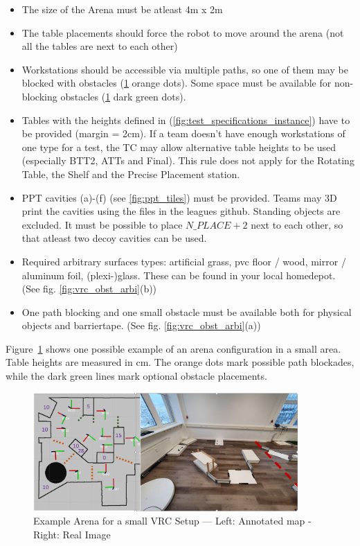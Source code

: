 \begin{itemize}
\item The size of the Arena must be atleast 4m x 2m
\item The table placements should force the robot to move around the arena (not all the tables are next to each other)
\item Workstations should be accessible via multiple paths, so one of them may be blocked with obstacles (\ref{fig:vrc_arena_example} orange dots). Some space must be available for non-blocking obstacles (\ref{fig:vrc_arena_example} dark green dots).
\item Tables with the heights defined in (\ref{fig:test_specifications_instance}) have to be provided (margin = 2cm). If a team doesn't have enough workstations of one type for a test, the TC may allow alternative table heights to be used (especially BTT2, ATTs and Final). This rule does not apply for the Rotating Table, the Shelf and the Precise Placement station.
\item PPT cavities (a)-(f) (see \ref{fig:ppt_tiles}) must be provided. Teams may 3D print the cavities using the files in the leagues github. Standing objects are excluded. It must be possible to place ${N\_PLACE + 2}$ next to each other, so that atleast two decoy cavities can be used. 
\item Required arbitrary surfaces types: artificial grass, pvc floor / wood, mirror / aluminum foil, (plexi-)glass. 
These can be found in your local homedepot. (See fig. \ref{fig:vrc_obst_arbi}(b))
\item One path blocking and one small obstacle must be available both for physical objects and barriertape. (See fig. \ref{fig:vrc_obst_arbi}(a))
\end{itemize}

Figure~\ref{fig:vrc_arena_example} shows one possible example of an arena configuration in a small area.
Table heights are measured in cm. 
The orange dots mark possible path blockades, while the dark green lines mark optional obstacle placements. 


\begin{figure}[h!]
\centering
\includegraphics[width=0.9\textwidth ]{./images/vrc_arena_example.png}
\caption{Example Arena for a small VRC Setup --- Left: Annotated map - Right: Real Image }
\label{fig:vrc_arena_example}
\end{figure}

